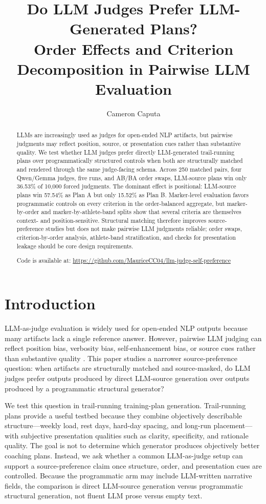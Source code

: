 \documentclass[11pt]{article}
\title{Do LLM Judges Prefer LLM-Generated Plans?\\
Order Effects and Criterion Decomposition in Pairwise LLM Evaluation}
\author{Cameron Caputa \\
}
\begin{document}
\maketitle

\begin{abstract}
LLMs are increasingly used as judges for open-ended NLP artifacts, but pairwise judgments may reflect position, source, or presentation cues rather than substantive quality. We test whether LLM judges prefer directly LLM-generated trail-running plans over programmatically structured controls when both are structurally matched and rendered through the same judge-facing schema. Across 250 matched pairs, four Qwen/Gemma judges, five runs, and AB/BA order swaps, LLM-source plans win only 36.53\% of 10,000 forced judgments. The dominant effect is positional: LLM-source plans win 57.54\% as Plan A but only 15.52\% as Plan B. Marker-level evaluation favors programmatic controls on every criterion in the order-balanced aggregate, but marker-by-order and marker-by-athlete-band splits show that several criteria are themselves context- and position-sensitive. Structural matching therefore improves source-preference studies but does not make pairwise LLM judgments reliable; order swaps, criterion-by-order analysis, athlete-band stratification, and checks for presentation leakage should be core design requirements.

Code is available at: \url{https://github.com/MauriceCC04/llm-judge-self-preference}
\end{abstract}

\section{Introduction}

LLM-as-judge evaluation is widely used for open-ended NLP outputs because many artifacts lack a single reference answer. However, pairwise LLM judging can reflect position bias, verbosity bias, self-enhancement bias, or source cues rather than substantive quality \citep{zheng2023llmasajudge,gu2024language}. This paper studies a narrower source-preference question: when artifacts are structurally matched and source-masked, do LLM judges prefer outputs produced by direct LLM-source generation over outputs produced by a programmatic structural generator?

We test this question in trail-running training-plan generation. Trail-running plans provide a useful testbed because they combine objectively describable structure---weekly load, rest days, hard-day spacing, and long-run placement---with subjective presentation qualities such as clarity, specificity, and rationale quality. The goal is not to determine which generator produces objectively better coaching plans. Instead, we ask whether a common LLM-as-judge setup can support a source-preference claim once structure, order, and presentation cues are controlled. Because the programmatic arm may include LLM-written narrative fields, the comparison is direct LLM-source generation versus programmatic structural generation, not fluent LLM prose versus empty text.
\end{document}
